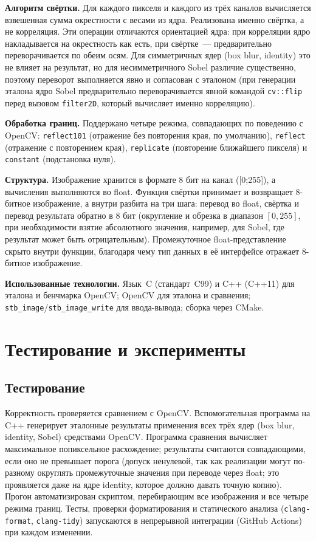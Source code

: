 \documentclass[a4paper]{article}
\begin{document}
\textbf{Алгоритм свёртки.} Для каждого пикселя и каждого из трёх каналов вычисляется взвешенная сумма окрестности с весами из ядра. Реализована именно свёртка, а не корреляция. Эти операции отличаются ориентацией ядра: при корреляции ядро накладывается на окрестность как есть, при свёртке~--- предварительно переворачивается по обеим осям. Для симметричных ядер (box blur, identity) это не влияет на результат, но для несимметричного Sobel различие существенно, поэтому переворот выполняется явно и согласован с эталоном (при генерации эталона ядро Sobel предварительно переворачивается явной командой \texttt{cv::flip} перед вызовом \texttt{filter2D}, который вычисляет именно корреляцию).

\textbf{Обработка границ.} Поддержано четыре режима, совпадающих по поведению с OpenCV: \texttt{reflect101} (отражение без повторения края, по умолчанию), \texttt{reflect} (отражение с повторением края), \texttt{replicate} (повторение ближайшего пикселя) и \texttt{constant} (подстановка нуля).

\textbf{Структура.} Изображение хранится в формате 8 бит на канал ([0;255]), а вычисления выполняются во float. Функция свёртки принимает и возвращает 8-битное изображение, а внутри разбита на три шага: перевод во float, свёртка и перевод результата обратно в 8 бит (округление и обрезка в диапазон $[0, 255]$, при необходимости взятие абсолютного значения, например, для Sobel, где результат может быть отрицательным). Промежуточное float-представление скрыто внутри функции, благодаря чему тип данных в её интерфейсе отражает 8-битное изображение.

\textbf{Использованные технологии.} Язык~C (стандарт~C99) и C++ (C++11) для эталона и бенчмарка OpenCV; OpenCV для эталона и сравнения; \texttt{stb\_image}/\texttt{stb\_image\_write} для ввода-вывода; сборка через CMake.

\section{Тестирование и эксперименты}

\subsection{Тестирование}

Корректность проверяется сравнением с OpenCV. Вспомогательная программа на C++ генерирует эталонные результаты применения всех трёх ядер (box blur, identity, Sobel) средствами OpenCV. Программа сравнения вычисляет максимальное попиксельное расхождение; результаты считаются совпадающими, если оно не превышает порога (допуск ненулевой, так как реализации могут по-разному округлять промежуточные значения при переводе через float; это проявляется даже на ядре identity, которое должно давать точную копию). Прогон автоматизирован скриптом, перебирающим все изображения и все четыре режима границ. Тесты, проверки форматирования и статического анализа (\texttt{clang-format}, \texttt{clang-tidy}) запускаются в непрерывной интеграции (GitHub Actions) при каждом изменении.
\end{document}
